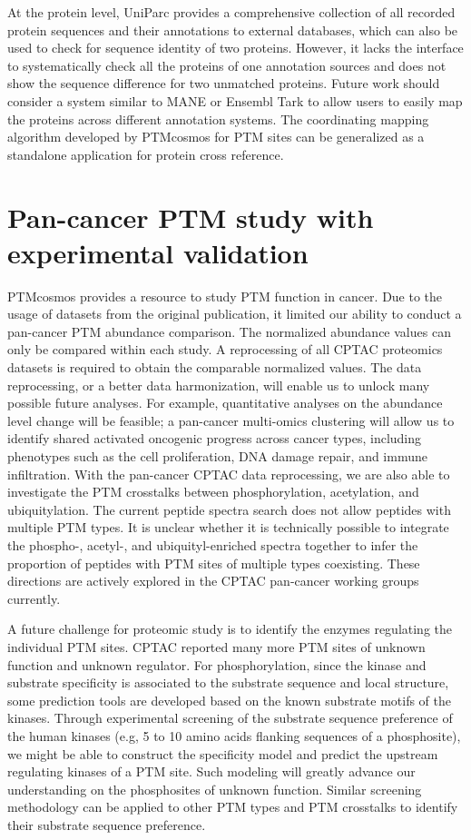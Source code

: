 At the protein level, UniParc \cite{leinonenr_apweilerr:UniProtArchive2004} provides a comprehensive collection of all recorded protein sequences and their annotations to external databases, which can also be used to check for sequence identity of two proteins.
However, it lacks the interface to systematically check all the proteins of one annotation sources and does not show the sequence difference for two unmatched proteins. Future work should consider a system similar to MANE or Ensembl Tark to allow users to easily map the proteins across different annotation systems. The coordinating mapping algorithm developed by PTMcosmos for PTM sites can be generalized as a standalone application for protein cross reference.



\section{Pan-cancer PTM study with experimental validation}
PTMcosmos provides a resource to study PTM function in cancer. Due to the usage of datasets from the original publication, it limited our ability to conduct a pan-cancer PTM abundance comparison. The normalized abundance values can only be compared within each study. A reprocessing of all CPTAC proteomics datasets is required to obtain the comparable normalized values. The data reprocessing, or a better data harmonization, will enable us to unlock many possible future analyses. For example, quantitative analyses on the abundance level change will be feasible; a pan-cancer multi-omics clustering will allow us to identify shared activated oncogenic progress across cancer types, including phenotypes such as the cell proliferation, DNA damage repair, and immune infiltration. With the pan-cancer CPTAC data reprocessing, we are also able to investigate the PTM crosstalks between phosphorylation, acetylation, and ubiquitylation. The current peptide spectra search does not allow peptides with multiple PTM types. It is unclear whether it is technically possible to integrate the phospho-, acetyl-, and ubiquityl-enriched spectra together to infer the proportion of peptides with PTM sites of multiple types coexisting. These directions are actively explored in the CPTAC pan-cancer working groups currently.

A future challenge for proteomic study is to identify the enzymes regulating the individual PTM sites. CPTAC reported many more PTM sites of unknown function and unknown regulator. For phosphorylation, since the kinase and substrate specificity is associated to the substrate sequence and local structure, some prediction tools are developed based on the known substrate motifs of the kinases. Through experimental screening of the substrate sequence preference of the human kinases (e.g, 5 to 10 amino acids flanking sequences of a phosphosite), we might be able to construct the specificity model and predict the upstream regulating kinases of a PTM site. Such modeling will greatly advance our understanding on the phosphosites of unknown function. Similar screening methodology can be applied to other PTM types and PTM crosstalks to identify their substrate sequence preference.


